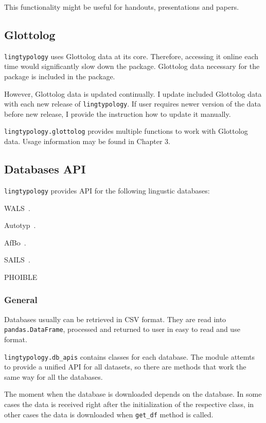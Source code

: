 \documentclass[a4paper,12pt]{article}
\begin{document}
This functionality might be useful for handouts, presentations and papers.

\subsection{Glottolog}

\texttt{lingtypology} uses Glottolog data at its core. Therefore, accessing it online each time would significantly slow down the package. Glottolog data necessary for the package is included in the package.

However, Glottolog data is updated continually. I update included Glottolog data with each new release of \texttt{lingtypology}. If user requires newer version of the data before new release, I provide the instruction how to update it manually.

\texttt{lingtypology.glottolog} provides multiple functions to work with Glottolog data. Usage information may be found in Chapter 3.

\subsection{Databases API}

\texttt{lingtypology} provides API for the following lingustic databases:
\begin{itemize}
\begin{samepage}
 \item WALS~\parencite{wals}.
 \item Autotyp~\parencite{autotyp}.
 \item AfBo~\parencite{afbo}.
 \item SAILS~\parencite{sails}.
 \item PHOIBLE~\parencite{phoible}
\end{samepage}
\end{itemize}

\subsubsection{General}
Databases usually can be retrieved in CSV format. They are read into \texttt{pandas.DataFrame}, processed and returned to user in easy to read and use format.

\texttt{lingtypology.db\_apis} contains classes for each database. The module attemts to provide a unified API for all datasets, so there are methods that work the same way for all the databases.

The moment when the database is downloaded depends on the database. In some cases the data is received right after the initialization of the respective class, in other cases the data is downloaded when \texttt{get\_df} method is called.
\end{document}
